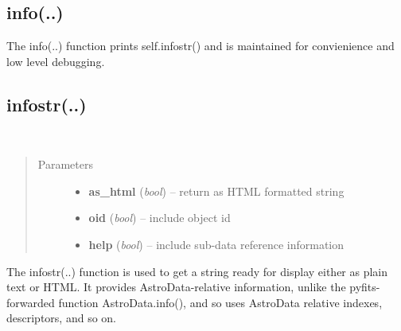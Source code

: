 \documentclass[letterpaper,10pt,english]{sphinxmanual}
\begin{document}
\subsection{info(..)}
\label{chapter_AstroDataClass:info}

\begin{fulllineitems}
\label{chapter_AstroDataClass:astrodata.data.AstroData.info}
The info(..) function prints self.infostr() and 
is maintained for convienience and low level debugging.

\end{fulllineitems}



\subsection{infostr(..)}
\label{chapter_AstroDataClass:infostr}

\begin{fulllineitems}
\label{chapter_AstroDataClass:astrodata.data.AstroData.infostr}~\begin{quote}\begin{description}
\item[{Parameters}] \leavevmode\begin{itemize}
\item {} 
\textbf{as\_html} (\emph{bool}) -- return as HTML formatted string

\item {} 
\textbf{oid} (\emph{bool}) -- include object id

\item {} 
\textbf{help} (\emph{bool}) -- include sub-data reference information

\end{itemize}

\end{description}\end{quote}

The infostr(..) function is used to get a string ready for display
either as plain text or HTML.  It provides AstroData-relative
information, unlike the pyfits-forwarded function AstroData.info(),
and so uses AstroData relative indexes, descriptors, and so on.

\end{fulllineitems}
\end{document}
